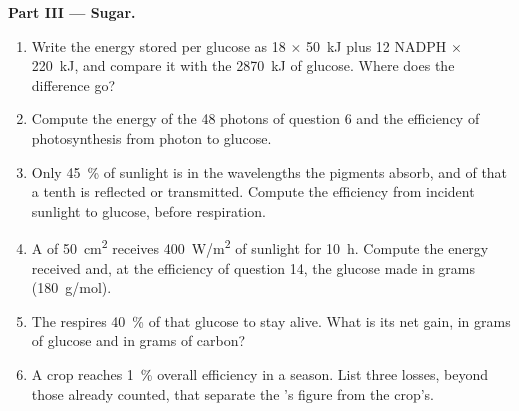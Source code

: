 \begin{problem}
\medskip
\noindent\textbf{Part III --- Sugar.}
\begin{enumerate}[resume]
  \item Write the energy stored per glucose as 18  $\times$
        \qty{50}{kJ} plus 12 NADPH $\times$ \qty{220}{kJ}, and compare
        it with the \qty{2870}{kJ} of glucose. Where does the
        difference go?
  \item Compute the energy of the 48 photons of question 6 and the
        efficiency of photosynthesis from photon to glucose.
  \item Only \qty{45}{\%} of sunlight is in the wavelengths the
        pigments absorb, and of that a tenth is reflected or
        transmitted. Compute the efficiency from incident sunlight to
        glucose, before respiration.
  \item A  of \qty{50}{cm^2} receives \qty{400}{W/m^2} of sunlight
        for \qty{10}{h}. Compute the energy received and, at the
        efficiency of question 14, the glucose made in grams
        (\qty{180}{g/mol}).
  \item The  respires \qty{40}{\%} of that glucose to stay alive.
        What is its net gain, in grams of glucose and in grams of
        carbon?
  \item A crop reaches \qty{1}{\%} overall efficiency in a season. List
        three losses, beyond those already counted, that separate the
        's figure from the crop's.
\end{enumerate}


\end{problem}
